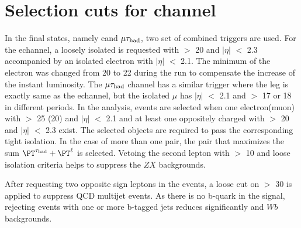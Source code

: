 \section{\texorpdfstring{Selection cuts for \leptonTau channel}{Selection cuts for lepton-tau channel}}
\label{sect:eleTauCuts}
In the \leptonTau final states, namely e\Tau and $\mu\tau_{\rm had}$,
two set of combined triggers are used. For the e\Tau channel, a loosely isolated \Tau is requested with \PT $>$ 20 \GeV and $|\eta|$ $<$ 2.3 
accompanied by an isolated electron with $|\eta|$ $<$ 2.1. The minimum \PT of the electron was changed from  20 to  22 \GeV 
during the run to compensate the increase of the instant luminosity.
The $\mu\tau_{\rm had}$ channel has a similar trigger where the \Tau leg is exactly same as the e\Tau channel, but the  isolated $\mu$  
has $|\eta|$ $<$ 2.1 and \PT $>$  17 or 18 \GeV in different periods. 
In the analysis, events are selected when one electron(muon) with \PT $>$ 25 (20) \GeV and $|\eta|$ $<$ 2.1 and at least 
one oppositely charged \Tau with \PT $>$ 20 \GeV and $|\eta|$ $<$ 2.3 exist. %
The selected objects are required to pass the corresponding tight isolation.
In the case of more than one pair, the pair that maximizes the sum $\PT^{\Tau} + \PT^{\ell}$ is selected.
Vetoing the second lepton with \PT $>$ 10 \GeV and loose isolation criteria helps to suppress the $ZX$ backgrounds.

After requesting two opposite sign leptons in the events, a loose cut on \MET $>$ 30 \GeV is applied to suppress QCD multijet events. 
As there is no b-quark in the signal, rejecting events with one or more b-tagged jets reduces significantly \ttbar and $Wb$ backgrounds.

